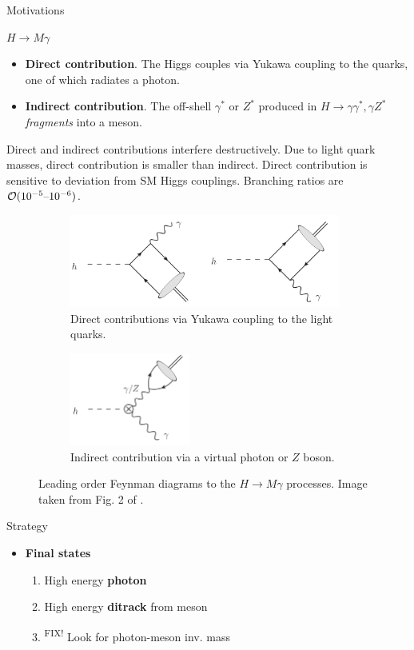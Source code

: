 \documentclass[9pt,aspectratio=1610]{beamer}
\newcommand{\khl}[1]{\textbf{\color{structure}#1}}
\newcommand{\ktodo}[1]{\colorbox{yellow!30}{{\color{red}\textsuperscript{\tiny FIX! }}#1}}
\begin{document}
\begin{frame}{Motivations}
	
	\(H \rightarrow M \gamma \) \cite{K_nig_2015}
	\begin{itemize}
		\item \textbf{Direct contribution}. The Higgs couples via Yukawa coupling to the quarks, one of which radiates a photon.
		\item \textbf{Indirect contribution}. The off-shell \(\gamma^*\) or \(Z^*\) produced in \(H\rightarrow \gamma\gamma^*, \gamma Z^*\) \textit{fragments} into a meson.
	\end{itemize}
	Direct and indirect contributions interfere destructively. Due to light quark masses, direct contribution is smaller than indirect. Direct contribution is sensitive to deviation from SM Higgs couplings. Branching ratios are \(\mathcal{O}(10^{-5}\textup{--}10^{-6})\).
	\begin{figure}[t!]
		\centering
		\begin{subfigure}[t]{0.48\linewidth}
			\centering
			\includegraphics[height=1.2in]{figures/Higgs_phirhoomega_direct.png}
			\caption{Direct contributions via Yukawa coupling to the light quarks.}
		\end{subfigure}
		\hfill
		\begin{subfigure}[t]{0.48\linewidth}
			\centering
			\includegraphics[height=1.2in]{figures/Higgs_phirhoomega_indirect.png}
			\caption{Indirect contribution via a virtual photon or \(Z\) boson.}
		\end{subfigure}
		\caption{Leading order Feynman diagrams to the \(H\rightarrow M\gamma\) processes. Image taken from Fig. 2 of \cite{K_nig_2015}.}
	\end{figure}
\end{frame}

\begin{frame}{Strategy}
	\begin{itemize}
		\item \khl{Final states}
		\begin{enumerate}
			\item High energy \textbf{photon}
			\item High energy \textbf{ditrack} from meson
			\item \ktodo{Look for photon-meson inv. mass}
		\end{enumerate}
	\end{itemize}
\end{frame}
\end{document}
